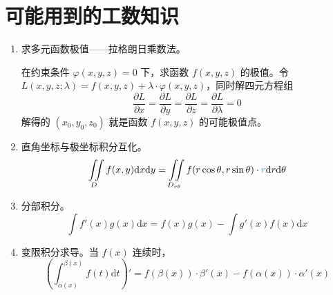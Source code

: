\documentclass[UTF8]{ctexart}
\newcommand\Concept[1]{\textcolor{cyan!70!black}{#1}}
\renewcommand\d{\mathrm{d}}
\begin{document}
\section{可能用到的工数知识}
\begin{enumerate}
  \item 求多元函数极值——拉格朗日乘数法。
  
  在约束条件 $\varphi(x,y,z)=0$ 下，求函数 $f(x,y,z)$ 的极值。令 $L(x,y,z;\lambda) = f(x,y,z) + \lambda\cdot\varphi(x,y,z)$，同时解四元方程组
  \begin{equation}\label{eq:拉格朗日乘数法}
    \dfrac{\partial L}{\partial x} = \dfrac{\partial L}{\partial y} = \dfrac{\partial L}{\partial z} =\dfrac{\partial L}{\partial \lambda} = 0
  \end{equation}
  解得的 $(x_0,y_0,z_0)$ 就是函数 $f(x,y,z)$ 的可能极值点。
  
  \item 直角坐标与极坐标积分互化。
  \begin{equation}\label{eq:直角坐标与极坐标积分互化}
    \iint\limits_{D} f(x,y)\d x\d y = \iint\limits_{D_{r\theta}} f(r\cos\theta,r\sin\theta)\cdot \Concept{r}\d r\d \theta
  \end{equation}
  
  \item 分部积分。
  \begin{equation}\label{eq:分部积分}
    \int f'(x)g(x)\d x = f(x)g(x) - \int g'(x)f(x)\d x
  \end{equation}
  
  \item 变限积分求导。当 $f(x)$ 连续时，
  \begin{equation}\label{eq:变上限积分}
    \left(\int_{\alpha(x)}^{\beta(x)} f(t)\d t\right)' = f(\beta(x))\cdot \beta'(x) - f(\alpha(x))\cdot \alpha'(x)
  \end{equation}
\end{enumerate}
\end{document}
